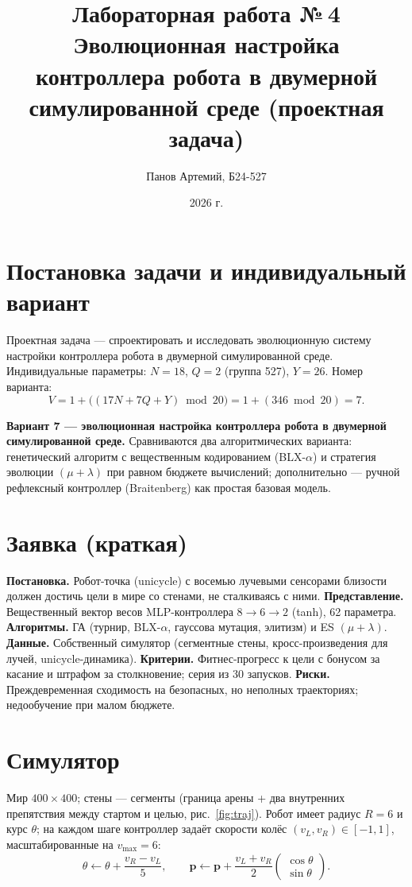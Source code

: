 \documentclass[12pt,a4paper]{article}
\title{Лабораторная работа №\,4\\ \large Эволюционная настройка контроллера робота в двумерной симулированной среде (проектная задача)}
\author{Панов Артемий, Б24-527}
\date{2026 г.}
\begin{document}
\maketitle

\section{Постановка задачи и индивидуальный вариант}

Проектная задача --- спроектировать и исследовать эволюционную систему
настройки контроллера робота в двумерной симулированной среде. Индивидуальные
параметры: $N = 18$, $Q = 2$ (группа 527), $Y = 26$. Номер варианта:
\[
V = 1 + \big((17N + 7Q + Y) \bmod 20\big) = 1 + (346 \bmod 20) = 7.
\]

\textbf{Вариант 7 --- эволюционная настройка контроллера робота в двумерной
симулированной среде.} Сравниваются два алгоритмических варианта: генетический
алгоритм с вещественным кодированием (BLX-$\alpha$) и стратегия эволюции
$(\mu+\lambda)$ при равном бюджете вычислений; дополнительно --- ручной
рефлексный контроллер (Braitenberg) как простая базовая модель.

\section{Заявка (краткая)}

\textbf{Постановка.} Робот-точка (unicycle) с восемью лучевыми сенсорами
близости должен достичь цели в мире со стенами, не сталкиваясь с ними.
\textbf{Представление.} Вещественный вектор весов MLP-контроллера
$8 \to 6 \to 2$ (tanh), 62 параметра. \textbf{Алгоритмы.} ГА (турнир,
BLX-$\alpha$, гауссова мутация, элитизм) и ES $(\mu+\lambda)$. \textbf{Данные.}
Собственный симулятор (сегментные стены, кросс-произведения для лучей,
unicycle-динамика). \textbf{Критерии.} Фитнес-прогресс к цели с бонусом за
касание и штрафом за столкновение; серия из 30 запусков. \textbf{Риски.}
Преждевременная сходимость на безопасных, но неполных траекториях;
недообучение при малом бюджете.

\section{Симулятор}

Мир $400 \times 400$; стены --- сегменты (граница арены + два внутренних
препятствия между стартом и целью, рис.~\ref{fig:traj}). Робот имеет радиус
$R = 6$ и курс $\theta$; на каждом шаге контроллер задаёт скорости колёс
$(v_L, v_R) \in [-1, 1]$, масштабированные на $v_{\max} = 6$:
\[
\theta \leftarrow \theta + \frac{v_R - v_L}{5}, \qquad
\mathbf{p} \leftarrow \mathbf{p} + \frac{v_L + v_R}{2}
\begin{pmatrix}\cos\theta \\ \sin\theta\end{pmatrix}.
\]
\end{document}
